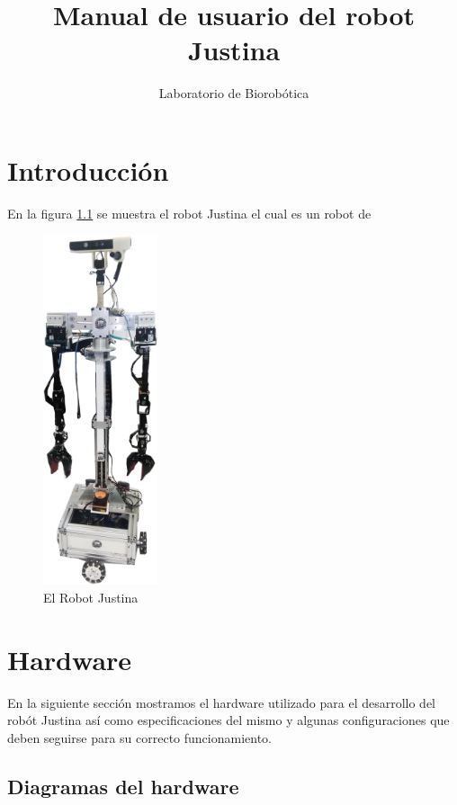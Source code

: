 \documentclass[a4paper]{book}
\title{Manual de usuario del robot Justina}
\author{Laboratorio de Biorobótica}
\begin{document}
\maketitle

\tableofcontents

\chapter{Introducción}
En la figura \ref{fig:introduction:Justina} se muestra el robot Justina el cual es un robot de

\begin{figure}
\centering
\includegraphics[width=0.3\textwidth]{Figures/Introduction/Justina.png}
\caption{El Robot Justina}
\label{fig:introduction:Justina}
\end{figure}

\chapter{Hardware}
En la siguiente sección mostramos el hardware utilizado para el desarrollo del robót Justina así como especificaciones del mismo y algunas configuraciones que deben seguirse para su correcto funcionamiento.
\section{Diagramas del hardware}
\end{document}
